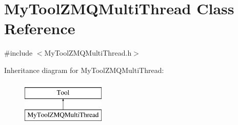 \hypertarget{classMyToolZMQMultiThread}{\section{My\-Tool\-Z\-M\-Q\-Multi\-Thread Class Reference}
\label{classMyToolZMQMultiThread}
}


{\ttfamily \#include $<$My\-Tool\-Z\-M\-Q\-Multi\-Thread.\-h$>$}

Inheritance diagram for My\-Tool\-Z\-M\-Q\-Multi\-Thread\-:\begin{figure}[H]
\begin{center}
\leavevmode
\includegraphics[height=2.000000cm]{classMyToolZMQMultiThread}
\end{center}
\end{figure}
